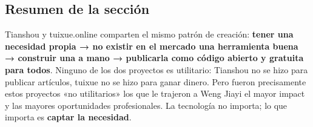 \subsection{Resumen de la sección}

Tianshou y tuixue.online comparten el mismo patrón de creación: \textbf{tener una necesidad propia → no existir en el mercado una herramienta buena → construir una a mano → publicarla como código abierto y gratuita para todos}. Ninguno de los dos proyectos es utilitario: Tianshou no se hizo para publicar artículos, tuixue no se hizo para ganar dinero. Pero fueron precisamente estos proyectos «no utilitarios» los que le trajeron a Weng Jiayi el mayor impact y las mayores oportunidades profesionales. La tecnología no importa; lo que importa es \textbf{captar la necesidad}.

